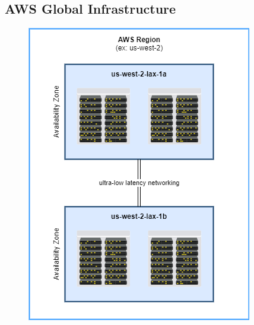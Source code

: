 \subsection{AWS Global Infrastructure}\label{subsec:aws-global-infrastructure}
\begin{figure}[h]
\includegraphics[scale=0.5]{cloud_computing/regions}
\centering\label{fig:aws-global-infrastructure}
\end{figure}

